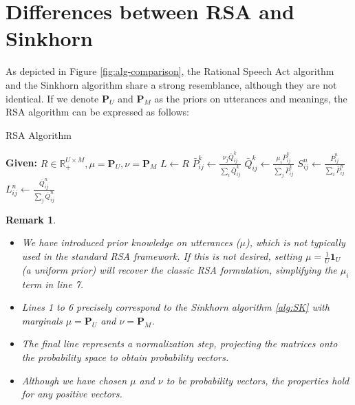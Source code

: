 \documentclass{article}
\newtheorem{remark}{Remark}[section] %
\begin{document}
\section{Differences between RSA and Sinkhorn} \label{sec:diff_SK_RSA}

As depicted in Figure \ref{fig:alg-comparison}, the Rational Speech Act algorithm and the Sinkhorn algorithm share a strong resemblance, although they are not identical. If we denote $\mathbf{P}_U$ and $\mathbf{P}_M$ as the priors on utterances and meanings, the RSA algorithm can be expressed as follows:

\begin{algorithm}[H]
    \caption{RSA Algorithm}  \label{alg:RSA_clean}
    \begin{algorithmic}[1]
        \State \textbf{Given:} $R \in \mathbb{R}^{U \times M}_{+}, \mu = \mathbf{P}_U, \nu = \mathbf{P}_M$
        \State $L \gets R$
            \State \( \bar P_{ij}^k \gets \frac{\nu_j \bar Q_{ij}^k}{\sum_i \bar Q_{ij}^k}\)
            \State \( \bar Q_{ij}^k \gets \frac{\mu_i \bar P_{ij}^k}{\sum_j \bar P_{ij}^k}\)
        \EndFor
        \State $S_{ij}^n \gets \frac{\bar P_{ij}^n}{\sum_i \bar P_{ij}^n}$
        \State $L_{ij}^n \gets \frac{\bar Q_{ij}^n}{\sum_j \bar Q_{ij}^n}$
    \end{algorithmic}
\end{algorithm}

    \begin{remark}
        \begin{itemize}
        \item We have introduced prior knowledge on utterances ($\mu$), which is not typically used in the standard RSA framework. If this is not desired, setting $\mu = \frac{1}{U} \mathbf{1}_U$ (a uniform prior) will recover the classic RSA formulation, simplifying the $\mu_i$ term in line 7.
        \item Lines 1 to 6 precisely correspond to the Sinkhorn algorithm \ref*{alg:SK} with marginals $\mu = \mathbf{P}_U$ and $\nu = \mathbf{P}_M$.
        \item The final line represents a normalization step, projecting the matrices onto the probability space to obtain probability vectors.
        \item Although we have chosen $\mu$ and $\nu$ to be probability vectors, the properties hold for any positive vectors.
        \end{itemize}
    \end{remark}
\end{document}
